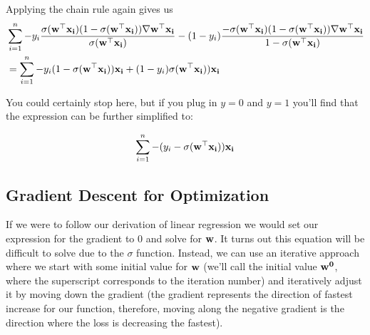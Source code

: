 \documentclass[assignment04_Solutions]{subfiles}
\begin{document}
\begin{exercise}[(60 minutes)]
\begin{boxedsolution}
Applying the chain rule again gives us
\begin{align}
& \sum_{i=1}^n -y_i \frac{\sigma( \mathbf{w}^\top \mathbf{x_i})(1-\sigma( \mathbf{w}^\top \mathbf{x_i}))\nabla \mathbf{w}^\top \mathbf{x_i}}{\sigma( \mathbf{w}^\top \mathbf{x_i})} - (1-y_i) \frac{- \sigma( \mathbf{w}^\top \mathbf{x_i})(1-\sigma( \mathbf{w}^\top \mathbf{x_i}))\nabla \mathbf{w}^\top \mathbf{x_i}}{1 - \sigma( \mathbf{w}^\top \mathbf{x_i})} \nonumber \\
 &= \sum_{i=1}^n -y_i (1-\sigma( \mathbf{w}^\top \mathbf{x_i}))\mathbf{x_i} + (1-y_i)  \sigma( \mathbf{w}^\top \mathbf{x_i})) \mathbf{x_i} 
 \end{align}
 
You could certainly stop here, but if you plug in $y=0$ and $y=1$ you'll find that the expression can be further simplified to:
 
 \begin{align}
\sum_{i=1}^n  -(y_i - \sigma(\mathbf{w}^\top \mathbf{x_i})) \mathbf{x_i} \nonumber
 \end{align}


\end{boxedsolution}

\ees
\end{exercise}


\subsection{Gradient Descent for Optimization}
If we were to follow our derivation of linear regression we would set our expression for the gradient to 0 and solve for $\mathbf{w}$.  It turns out this equation will be difficult to solve due to the $\sigma$ function.  Instead, we can use an iterative approach where we start with some initial value for $\mathbf{w}$ (we'll call the initial value $\mathbf{w^0}$, where the superscript corresponds to the iteration number) and iteratively adjust it by moving down the gradient (the gradient represents the direction of fastest increase for our function, therefore, moving along the negative gradient is the direction where the loss is decreasing the fastest).
\end{document}
